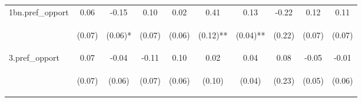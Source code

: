 \begin{center}
\begin{tabular}{lccccccccc}
\noalign{\smallskip}1bn.pref_opport & 0.06 & -0.15 & 0.10 & 0.02 & 0.41 & 0.13 & -0.22 & 0.12 & 0.11\\
 & \begin{footnotesize}(0.07)\end{footnotesize} & \begin{footnotesize}(0.06)*\end{footnotesize} & \begin{footnotesize}(0.07)\end{footnotesize} & \begin{footnotesize}(0.06)\end{footnotesize} & \begin{footnotesize}(0.12)**\end{footnotesize} & \begin{footnotesize}(0.04)**\end{footnotesize} & \begin{footnotesize}(0.22)\end{footnotesize} & \begin{footnotesize}(0.07)\end{footnotesize} & \begin{footnotesize}(0.07)\end{footnotesize}\\
\noalign{\smallskip}3.pref_opport & 0.07 & -0.04 & -0.11 & 0.10 & 0.02 & 0.04 & 0.08 & -0.05 & -0.01\\
 & \begin{footnotesize}(0.07)\end{footnotesize} & \begin{footnotesize}(0.06)\end{footnotesize} & \begin{footnotesize}(0.07)\end{footnotesize} & \begin{footnotesize}(0.06)\end{footnotesize} & \begin{footnotesize}(0.10)\end{footnotesize} & \begin{footnotesize}(0.04)\end{footnotesize} & \begin{footnotesize}(0.23)\end{footnotesize} & \begin{footnotesize}(0.05)\end{footnotesize} & \begin{footnotesize}(0.06)\end{footnotesize}\\

\end{tabular}
\end{center}
